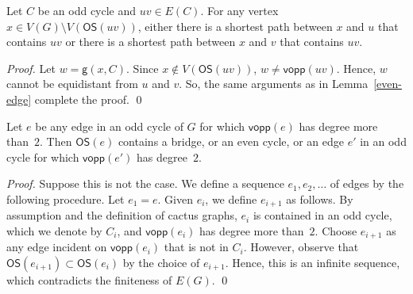 \documentclass[letter,runningheads,envcountsame,envcountsect]{llncs}
\newcommand{\vopp}{\mathsf{vopp}}
\newcommand{\os}{\mathsf{OS}}
\newcommand{\g}{\mathsf{g}}
\begin{document}
\begin{lemma}
	\label{odd-edge}
	Let $C$ be an odd cycle and $uv\in E(C)$.
	For any vertex $x\in V(G)\setminus  V(\os(uv)) $, either there is a shortest path between $x$ and $u$ that contains $uv$ or there is a shortest path between $x$ and $v$ that contains $uv$.
\end{lemma}
\begin{proof}
	Let $w=\g(x,C)$.
	Since $x\notin V(\os(uv))$, $w\neq \vopp(uv)$.
	Hence, $w$ cannot be equidistant from $u$ and $v$.
	So, the same arguments as in Lemma~\ref{even-edge} complete the proof.
\qed\end{proof}


\begin{lemma} \label{opp-exists}
Let $e$ be any edge in an odd cycle of $G$ for which $\vopp(e)$ has degree more than~$2$. Then $\os(e)$ contains a bridge, or an even cycle, or an edge $e'$ in an odd cycle for which $\vopp(e')$ has degree~$2$.
\end{lemma}
\begin{proof}
Suppose this is not the case. We define a sequence $e_1,e_2,\dots$ of edges by the following procedure. Let $e_1=e$. Given $e_i$, we define $e_{i+1}$ as follows. By assumption and the definition of cactus graphs, $e_i$ is contained in an odd cycle, which we denote by $C_i$, and $\vopp(e_i)$ has degree more than~$2$. Choose $e_{i+1}$ as any edge incident on $\vopp(e_i)$ that is not in $C_i$. However, observe that $\os(e_{i+1}) \subset \os(e_i)$ by the choice of $e_{i+1}$. Hence, this is an infinite sequence, which contradicts the finiteness of $E(G)$.
\qed\end{proof}
\end{document}
